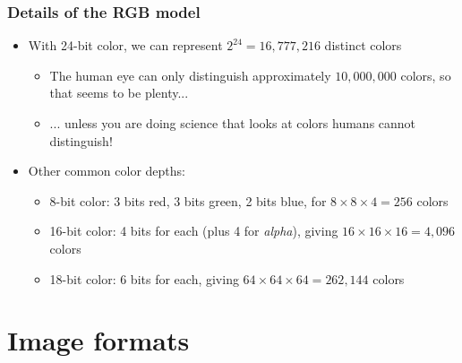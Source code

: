 \documentclass{beamer}
\begin{document}
\begin{frame}
	\frametitle{Details of the RGB model}

	\begin{itemize}

		\item With 24-bit color, we can represent $2^{24} = 16,777,216$ distinct colors

		\begin{itemize}

			\item The human eye can only distinguish approximately $10,000,000$ colors, so that seems to be plenty...
			
			\item ... unless you are doing science that looks at colors humans cannot distinguish!

		\end{itemize}

		\item Other common color depths:

		\begin{itemize}

			\item 8-bit color: 3 bits red, 3 bits green, 2 bits blue, for $8 \times 8 \times 4 = 256$ colors

			\item 16-bit color: 4 bits for each (plus 4 for {\em alpha}), giving $16 \times 16 \times 16 = 4,096$ colors

			\item 18-bit color: 6 bits for each, giving $64 \times 64 \times 64 = 262,144$ colors

		\end{itemize}

	\end{itemize}

\end{frame}

\section{Image formats}
\end{document}
